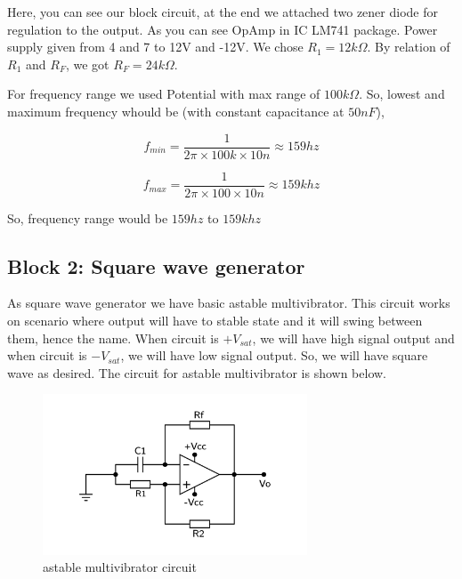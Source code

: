 \documentclass[12pt]{article}
\begin{document}
Here, you can see our block circuit, at the end we attached two zener diode for regulation to the output. As you can see OpAmp in IC LM741 package. Power supply given from  4 and 7 to 12V and -12V. We chose \(R_{1}=12k\Omega\). By relation of \(R_{1}\) and \(R_{F}\), we got \(R_{F}=24k\Omega\).

For frequency range we used Potential with max range of \(100k\Omega\). So, lowest and maximum frequency whould be (with constant capacitance at \(50nF\)),

\begin{equation*}
\label{eq:org9ac464a}
  f_{min} = \frac{1}{2\pi\times100k\times 10n} \approx 159 hz
\end{equation*}

\begin{equation*}
\label{eq:orgc57d177}
  f_{max} = \frac{1}{2\pi\times100\times 10n} \approx 159k hz
\end{equation*}

So, frequency range would be \(159 hz\) to \(159k hz\)


\subsection{Block 2: Square wave generator}
\label{sec:org1753863}

As square wave generator we have basic astable multivibrator. This circuit works on scenario where output will have to stable state and it will swing between them, hence the name. When circuit is \(+V_{sat}\), we will have high signal output and when circuit is \(-V_{sat}\), we will have low signal output. So, we will have square wave as desired. The circuit for astable multivibrator is shown below.

\begin{figure}[H]
    \centering
    \label{square}
    \includegraphics[width=0.7\textwidth]{imgs/square.png}
    \caption{astable multivibrator circuit}
\end{figure}
\end{document}
